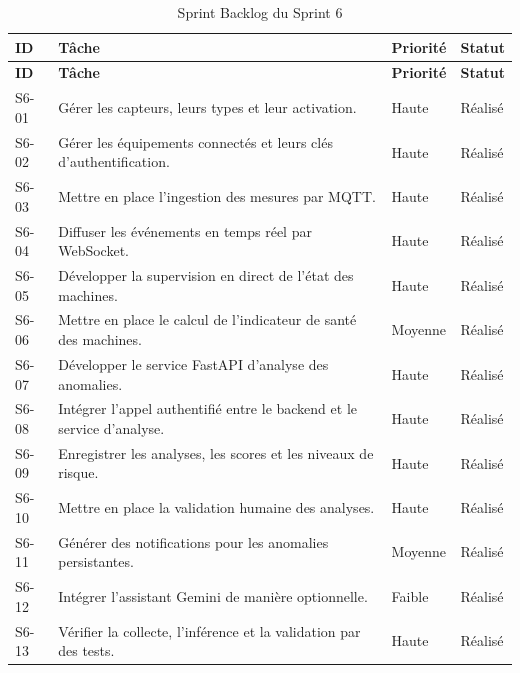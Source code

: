 {\footnotesize
\setlength{\tabcolsep}{4pt}
\begin{longtable}{|p{0.9cm}|>{\raggedright\arraybackslash}p{9.1cm}|>{\raggedright\arraybackslash}p{1.6cm}|>{\raggedright\arraybackslash}p{1.6cm}|}
\caption{Sprint Backlog du Sprint 6}
\label{tab:sprint6-backlog}\\
\hline
\textbf{ID} & \textbf{Tâche} & \textbf{Priorité} & \textbf{Statut} \\
\hline
\endfirsthead

\hline
\textbf{ID} & \textbf{Tâche} & \textbf{Priorité} & \textbf{Statut} \\
\hline
\endhead

S6-01 &
Gérer les capteurs, leurs types et leur activation. &
Haute & Réalisé \\
\hline

S6-02 &
Gérer les équipements connectés et leurs clés d'authentification. &
Haute & Réalisé \\
\hline

S6-03 &
Mettre en place l'ingestion des mesures par MQTT. &
Haute & Réalisé \\
\hline

S6-04 &
Diffuser les événements en temps réel par WebSocket. &
Haute & Réalisé \\
\hline

S6-05 &
Développer la supervision en direct de l'état des machines. &
Haute & Réalisé \\
\hline

S6-06 &
Mettre en place le calcul de l'indicateur de santé des machines. &
Moyenne & Réalisé \\
\hline

S6-07 &
Développer le service FastAPI d'analyse des anomalies. &
Haute & Réalisé \\
\hline

S6-08 &
Intégrer l'appel authentifié entre le backend et le service d'analyse. &
Haute & Réalisé \\
\hline

S6-09 &
Enregistrer les analyses, les scores et les niveaux de risque. &
Haute & Réalisé \\
\hline

S6-10 &
Mettre en place la validation humaine des analyses. &
Haute & Réalisé \\
\hline

S6-11 &
Générer des notifications pour les anomalies persistantes. &
Moyenne & Réalisé \\
\hline

S6-12 &
Intégrer l'assistant Gemini de manière optionnelle. &
Faible & Réalisé \\
\hline

S6-13 &
Vérifier la collecte, l'inférence et la validation par des tests. &
Haute & Réalisé \\
\hline

\end{longtable}}

